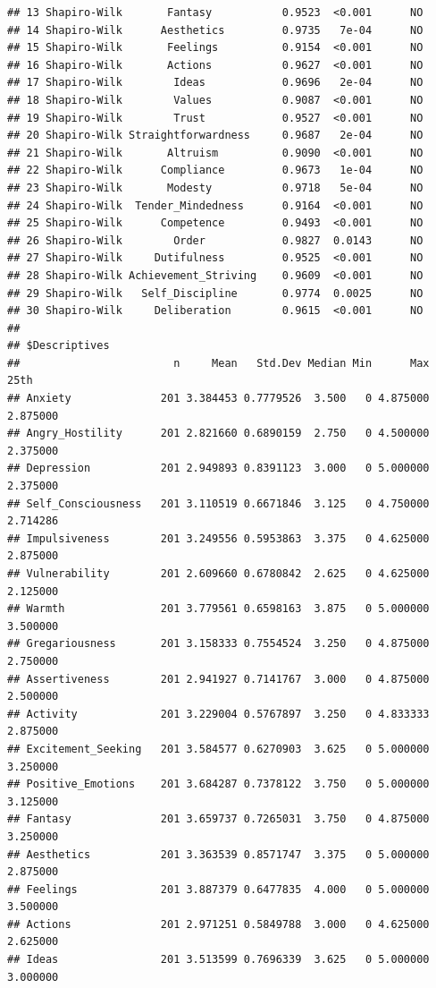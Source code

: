 \documentclass{article}\usepackage[]{graphicx}\usepackage[]{color}
\makeatletter
\newenvironment{kframe}{%
 \def\at@end@of@kframe{}%
 \ifinner\ifhmode%
  \def\at@end@of@kframe{\end{minipage}}%
  \begin{minipage}{\columnwidth}%
 \fi\fi%
 \def\FrameCommand##1{\hskip\@totalleftmargin \hskip-\fboxsep
 \colorbox{shadecolor}{##1}\hskip-\fboxsep
     \hskip-\linewidth \hskip-\@totalleftmargin \hskip\columnwidth}%
 \MakeFramed {\advance\hsize-\width
   \@totalleftmargin\z@ \linewidth\hsize
   \@setminipage}}%
 {\par\unskip\endMakeFramed%
 \at@end@of@kframe}
\newenvironment{knitrout}{}{} %
\makeatother
\begin{document}
\begin{knitrout}
\begin{kframe}
\begin{verbatim}
## 13 Shapiro-Wilk       Fantasy           0.9523  <0.001      NO    
## 14 Shapiro-Wilk      Aesthetics         0.9735   7e-04      NO    
## 15 Shapiro-Wilk       Feelings          0.9154  <0.001      NO    
## 16 Shapiro-Wilk       Actions           0.9627  <0.001      NO    
## 17 Shapiro-Wilk        Ideas            0.9696   2e-04      NO    
## 18 Shapiro-Wilk        Values           0.9087  <0.001      NO    
## 19 Shapiro-Wilk        Trust            0.9527  <0.001      NO    
## 20 Shapiro-Wilk Straightforwardness     0.9687   2e-04      NO    
## 21 Shapiro-Wilk       Altruism          0.9090  <0.001      NO    
## 22 Shapiro-Wilk      Compliance         0.9673   1e-04      NO    
## 23 Shapiro-Wilk       Modesty           0.9718   5e-04      NO    
## 24 Shapiro-Wilk  Tender_Mindedness      0.9164  <0.001      NO    
## 25 Shapiro-Wilk      Competence         0.9493  <0.001      NO    
## 26 Shapiro-Wilk        Order            0.9827  0.0143      NO    
## 27 Shapiro-Wilk     Dutifulness         0.9525  <0.001      NO    
## 28 Shapiro-Wilk Achievement_Striving    0.9609  <0.001      NO    
## 29 Shapiro-Wilk   Self_Discipline       0.9774  0.0025      NO    
## 30 Shapiro-Wilk     Deliberation        0.9615  <0.001      NO    
## 
## $Descriptives
##                        n     Mean   Std.Dev Median Min      Max     25th
## Anxiety              201 3.384453 0.7779526  3.500   0 4.875000 2.875000
## Angry_Hostility      201 2.821660 0.6890159  2.750   0 4.500000 2.375000
## Depression           201 2.949893 0.8391123  3.000   0 5.000000 2.375000
## Self_Consciousness   201 3.110519 0.6671846  3.125   0 4.750000 2.714286
## Impulsiveness        201 3.249556 0.5953863  3.375   0 4.625000 2.875000
## Vulnerability        201 2.609660 0.6780842  2.625   0 4.625000 2.125000
## Warmth               201 3.779561 0.6598163  3.875   0 5.000000 3.500000
## Gregariousness       201 3.158333 0.7554524  3.250   0 4.875000 2.750000
## Assertiveness        201 2.941927 0.7141767  3.000   0 4.875000 2.500000
## Activity             201 3.229004 0.5767897  3.250   0 4.833333 2.875000
## Excitement_Seeking   201 3.584577 0.6270903  3.625   0 5.000000 3.250000
## Positive_Emotions    201 3.684287 0.7378122  3.750   0 5.000000 3.125000
## Fantasy              201 3.659737 0.7265031  3.750   0 4.875000 3.250000
## Aesthetics           201 3.363539 0.8571747  3.375   0 5.000000 2.875000
## Feelings             201 3.887379 0.6477835  4.000   0 5.000000 3.500000
## Actions              201 2.971251 0.5849788  3.000   0 4.625000 2.625000
## Ideas                201 3.513599 0.7696339  3.625   0 5.000000 3.000000

\end{verbatim}
\end{kframe}
\end{knitrout}
\end{document}

